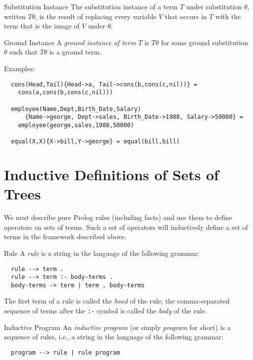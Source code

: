 \begin{definition}{Substitution Instance}
  The substitution instance of a term $T$ under substitution $\theta$,
  written $T\theta$, is the result of replacing every variable $V$
  that occurs in $T$ with the term that is the image of $V$ under
  $\theta$.
\end{definition}
\begin{definition}{Ground Instance}
  A {\em ground instance of term $T$} is $T\theta$ for some ground
  substitution $\theta$ such that $T\theta$ is a ground term.
\end{definition}
Examples:
\begin{example}
\begin{verbatim}
  cons(Head,Tail){Head->a, Tail->cons(b,cons(c,nil))} =
    cons(a,cons(b,cons(c,nil)))

  employee(Name,Dept,Birth_Date,Salary)
      {Name->george, Dept->sales, Birth_Date->1988, Salary->50000} =
    employee(george,sales,1988,50000)

  equal(X,X){X->bill,Y->george} = equal(bill,bill)
\end{verbatim}
\end{example}

\section{Inductive Definitions of Sets of Trees}

We next describe pure Prolog rules (including facts) and use them to
define operators on sets of terms.  Such a set of operators will
inductively define a set of terms in the framework described above.

\begin{definition}{Rule}
A {\em rule} is a string in the language of the following grammar:
\begin{verbatim}
  rule --> term .
  rule --> term :- body-terms .
  body-terms -> term | term , body-terms
\end{verbatim}
\end{definition}
The first term of a rule is called the {\em head} of the rule; the
comma-separated sequence of terms after the \verb|:-| symbol is called
the {\em body} of the rule.

\begin{definition}{Inductive Program}
  An {\em inductive program} (or simply {\em program} for short) is a
  sequence of rules, i.e., a string in the language of the following
  grammar:
\begin{verbatim}
  program --> rule | rule program
\end{verbatim}
\end{definition}


